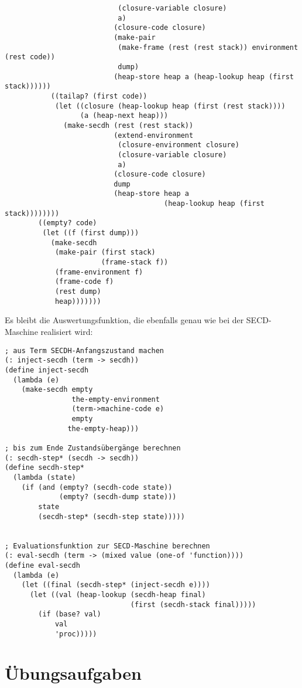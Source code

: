 \begin{verbatim}
                           (closure-variable closure)
                           a)
                          (closure-code closure)
                          (make-pair
                           (make-frame (rest (rest stack)) environment (rest code))
                           dump)
                          (heap-store heap a (heap-lookup heap (first stack))))))
           ((tailap? (first code))
            (let ((closure (heap-lookup heap (first (rest stack))))
                  (a (heap-next heap)))
              (make-secdh (rest (rest stack))
                          (extend-environment
                           (closure-environment closure)
                           (closure-variable closure)
                           a)
                          (closure-code closure)
                          dump
                          (heap-store heap a
                                      (heap-lookup heap (first stack))))))))
        ((empty? code)
         (let ((f (first dump)))
           (make-secdh
            (make-pair (first stack)
                       (frame-stack f))
            (frame-environment f)
            (frame-code f)
            (rest dump)
            heap)))))))
\end{verbatim}    
%
Es bleibt die Auswertungsfunktion, die ebenfalls genau wie bei der
SECD-Maschine realisiert wird:
%
\begin{verbatim}
; aus Term SECDH-Anfangszustand machen
(: inject-secdh (term -> secdh))
(define inject-secdh
  (lambda (e)
    (make-secdh empty
                the-empty-environment
                (term->machine-code e)
                empty
               the-empty-heap)))

; bis zum Ende Zustandsübergänge berechnen
(: secdh-step* (secdh -> secdh))
(define secdh-step*
  (lambda (state)
    (if (and (empty? (secdh-code state))
             (empty? (secdh-dump state)))
        state
        (secdh-step* (secdh-step state)))))


; Evaluationsfunktion zur SECD-Maschine berechnen
(: eval-secdh (term -> (mixed value (one-of 'function))))
(define eval-secdh
  (lambda (e)
    (let ((final (secdh-step* (inject-secdh e))))
      (let ((val (heap-lookup (secdh-heap final)
                              (first (secdh-stack final)))))
        (if (base? val)
            val
            'proc)))))
\end{verbatim}


\section*{Übungsaufgaben}

